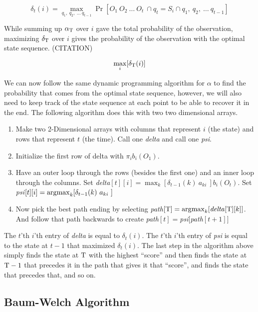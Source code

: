 \begin{equation}
  \delta_t(i) = \max_{q_1,\ q_2,\ \ldots\ q_{t-1}} \Pr[O_1\ O_2\ \ldots\
  O_t\ \cap q_t = S_i \cap q_1,\ q_2,\ \ldots\ q_{t-1}]
\end{equation}

While summing up $\alpha_{\mathrm{T}}$ over $i$ gave the total probability of the
observation, maximizing $\delta_{\mathrm{T}}$ over $i$ gives the probability of
the observation with the optimal state sequence. (CITATION)

\begin{equation}
  \max_i[\delta_{\mathrm{T}}(i)]
\end{equation}

We can now follow the same dynamic programming algorithm for $\alpha$ to
find the probability that comes from the optimal state sequence,
however, we will also need to keep track of the state sequence at each
point to be able to recover it in the end. The following algorithm does
this with two two dimensional arrays.

\begin{enumerate}
    \item Make two 2-Dimensional arrays with columns that
      represent $i$ (the state) and rows that represent $t$ (the time).
      Call one \emph{delta} and call one \emph{psi}.
    \item Initialize the first row of delta with $\pi_i b_i(O_1)$.
    \item Have an outer loop through the rows (besides the first one)
      and an inner loop through the columns. Set \emph{delta}$[t][i] =
      \max_k[\delta_{t-1}(k)\ a_{ki}\ ] b_i(O_t)$. Set \emph{psi}$[t][i]
      = \operatorname*{\arg\!\max}_k[\delta_{t-1}(k)\ a_{ki}\ ]$
    \item Now pick the best path ending by selecting \emph{path}$[\mathrm{T}] =
      \operatorname*{\arg\!\max}_k[\textrm{\emph{delta}}[\mathrm{T}][k]]$. And follow that path
      backwards to create \emph{path}$[t] =
      $\emph{psi}$[$\emph{path}$[t+1]]$
\end{enumerate}

The $t$'th $i$'th entry of \emph{delta} is equal to $\delta_t(i)$.
The $t$'th $i$'th entry of \emph{psi} is equal to the state at $t-1$
that maximized $\delta_t(i)$. The last step in the algorithm above
simply finds the state at $\mathrm{T}$ with the highest ``score'' and then finds
the state at $\mathrm{T} - 1$ that precedes it in the path that gives it that
``score'', and finds the state that precedes that, and so on.

\subsection{Baum-Welch Algorithm}

